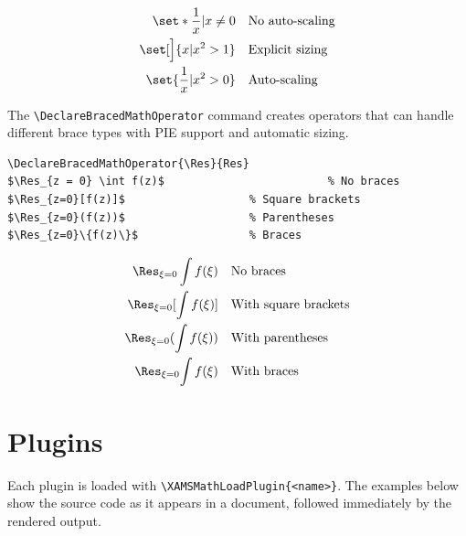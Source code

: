 \documentclass{article}
\begin{document}
\begin{align*}
  \set*{\frac{1}{x} | x \neq 0} &\quad\text{No auto-scaling} \\
  \set[\Big]{x | x^2 > 1} 		&\quad\text{Explicit sizing} \\
  \set{\frac{1}{x} | x^2 > 0} 	&\quad\text{Auto-scaling} 
\end{align*}



The \verb|\DeclareBracedMathOperator| command creates operators that can handle different brace types with PIE support and automatic sizing.

\begin{verbatim}
\DeclareBracedMathOperator{\Res}{Res}
$\Res_{z = 0} \int f(z)$                         % No braces
$\Res_{z=0}[f(z)]$                   % Square brackets
$\Res_{z=0}(f(z))$                   % Parentheses
$\Res_{z=0}\{f(z)\}$                 % Braces
\end{verbatim}

\begin{align*}
  \Res_{\xi = 0} \int f(\xi) &\quad\text{No braces} \\
  \Res_{\xi=0}[\int f(\xi)] &\quad\text{With square brackets} \\
  \Res_{\xi=0}(\int f(\xi)) &\quad\text{With parentheses} \\
  \Res_{\xi=0}{\int f(\xi)} &\quad\text{With braces}
\end{align*}

\section{Plugins}

Each plugin is loaded with \verb|\XAMSMathLoadPlugin{<name>}|. The examples below show the source code as it appears in a document, followed immediately by the rendered output.
\end{document}
